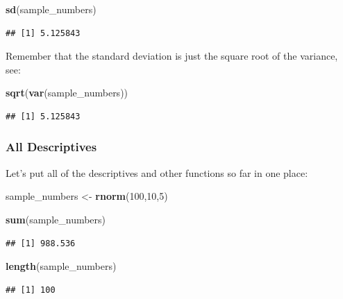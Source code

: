 \documentclass[]{book}
\newenvironment{Shaded}{\begin{snugshade}}{\end{snugshade}}
\newcommand{\KeywordTok}[1]{\textcolor[rgb]{0.13,0.29,0.53}{\textbf{{#1}}}}
\newcommand{\DecValTok}[1]{\textcolor[rgb]{0.00,0.00,0.81}{{#1}}}
\newcommand{\StringTok}[1]{\textcolor[rgb]{0.31,0.60,0.02}{{#1}}}
\newcommand{\NormalTok}[1]{{#1}}
\theoremstyle{definition}
\theoremstyle{definition}
\theoremstyle{definition}
\theoremstyle{remark}
\begin{document}
\begin{Shaded}
\begin{Highlighting}[]
\KeywordTok{sd}\NormalTok{(sample_numbers)}
\end{Highlighting}
\end{Shaded}

\begin{verbatim}
## [1] 5.125843
\end{verbatim}

Remember that the standard deviation is just the square root of the
variance, see:

\begin{Shaded}
\begin{Highlighting}[]
\KeywordTok{sqrt}\NormalTok{(}\KeywordTok{var}\NormalTok{(sample_numbers))}
\end{Highlighting}
\end{Shaded}

\begin{verbatim}
## [1] 5.125843
\end{verbatim}

\subsubsection{All Descriptives}\label{all-descriptives}

Let's put all of the descriptives and other functions so far in one
place:

\begin{Shaded}
\begin{Highlighting}[]
\NormalTok{sample_numbers <-}\StringTok{ }\KeywordTok{rnorm}\NormalTok{(}\DecValTok{100}\NormalTok{,}\DecValTok{10}\NormalTok{,}\DecValTok{5}\NormalTok{)}

\KeywordTok{sum}\NormalTok{(sample_numbers)}
\end{Highlighting}
\end{Shaded}

\begin{verbatim}
## [1] 988.536
\end{verbatim}

\begin{Shaded}
\begin{Highlighting}[]
\KeywordTok{length}\NormalTok{(sample_numbers)}
\end{Highlighting}
\end{Shaded}

\begin{verbatim}
## [1] 100
\end{verbatim}
\end{document}
